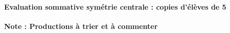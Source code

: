 \paragraph{Evaluation sommative symétrie centrale : copies d'élèves de 5\\}
\textbf{\color{red}Note : Productions à trier et à commenter}
\begin{figure}[!h]
\end{figure}
